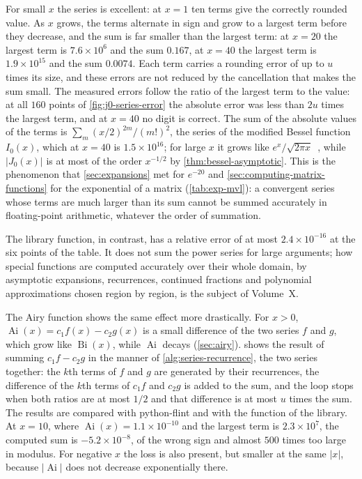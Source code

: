 For small $x$ the series is excellent: at $x=1$ ten terms give the correctly rounded value. As $x$ grows, the terms alternate in sign and grow to a largest term before they decrease, and the sum is far smaller than the largest term: at $x=20$ the largest term is $7.6\times10^6$ and the sum $0.167$, at $x=40$ the largest term is $1.9\times10^{15}$ and the sum $0.0074$. Each term carries a rounding error of up to $u$ times its size, and these errors are not reduced by the cancellation that makes the sum small. The measured errors follow the ratio of the largest term to the value: at all $160$ points of \cref{fig:j0-series-error} the absolute error was less than $2u$ times the largest term, and at $x=40$ no digit is correct. The sum of the absolute values of the terms is $\sum_m(x/2)^{2m}/(m!)^2$, the series of the modified Bessel function $I_0(x)$, which at $x=40$ is $1.5\times10^{16}$; for large $x$ it grows like $e^x/\sqrt{2\pi x}$~\cite[Sect.~10.40]{olver2010nist}, while $|J_0(x)|$ is at most of the order $x^{-1/2}$ by \cref{thm:bessel-asymptotic}. This is the phenomenon that \cref{sec:expansions} met for $e^{-20}$ and \cref{sec:computing-matrix-functions} for the exponential of a matrix (\cref{tab:exp-mvl}): a convergent series whose terms are much larger than its sum cannot be summed accurately in floating-point arithmetic, whatever the order of summation.

The library function, in contrast, has a relative error of at most $2.4\times10^{-16}$ at the six points of the table. It does not sum the power series for large arguments; how special functions are computed accurately over their whole domain, by asymptotic expansions, recurrences, continued fractions and polynomial approximations chosen region by region, is the subject of Volume~X.

The Airy function shows the same effect more drastically. For $x>0$, $\operatorname{Ai}(x)=c_1f(x)-c_2g(x)$ is a small difference of the two series $f$ and $g$, which grow like $\operatorname{Bi}(x)$, while $\operatorname{Ai}$ decays (\cref{sec:airy}).  shows the result of summing $c_1f-c_2g$ in the manner of \cref{alg:series-recurrence}, the two series together: the $k$th terms of $f$ and $g$ are generated by their recurrences, the difference of the $k$th terms of $c_1f$ and $c_2g$ is added to the sum, and the loop stops when both ratios are at most $1/2$ and that difference is at most $u$ times the sum. The results are compared with python-flint and with the function  of the library. At $x=10$, where $\operatorname{Ai}(x)=1.1\times10^{-10}$ and the largest term is $2.3\times10^7$, the computed sum is $-5.2\times10^{-8}$, of the wrong sign and almost $500$ times too large in modulus. For negative $x$ the loss is also present, but smaller at the same $|x|$, because $|\operatorname{Ai}|$ does not decrease exponentially there.

